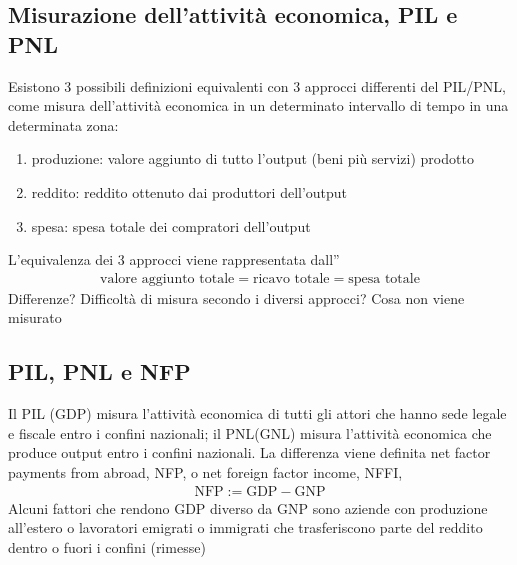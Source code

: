 \documentclass[letterpaper,10pt,italian]{jupyterBook}
\begin{document}
\subsection{Misurazione dell’attività economica, PIL e PNL}
\label{\detokenize{ch/macro:misurazione-dell-attivita-economica-pil-e-pnl}}\label{\detokenize{ch/macro:economics-hs-macro-intro-econ-measure-gdp}}
\sphinxAtStartPar
Esistono 3 possibili definizioni equivalenti con 3 approcci differenti del PIL/PNL, come misura dell’attività economica in un determinato intervallo di tempo in una determinata zona:
\begin{enumerate}
%
\item {} 
\sphinxAtStartPar
produzione: valore aggiunto di tutto l’output (beni più servizi) prodotto

\item {} 
\sphinxAtStartPar
reddito: reddito ottenuto dai produttori dell’output

\item {} 
\sphinxAtStartPar
spesa: spesa totale dei compratori dell’output

\end{enumerate}

\sphinxAtStartPar
L’equivalenza dei 3 approcci viene rappresentata dall”
\begin{equation*}
\begin{split} \text{valore aggiunto totale} = \text{ricavo totale} = \text{spesa totale} \end{split}
\end{equation*}
\sphinxAtStartPar
{} Differenze? Difficoltà di misura secondo i diversi approcci? Cosa non viene misurato


\subsection{PIL, PNL e NFP}
\label{\detokenize{ch/macro:pil-pnl-e-nfp}}\label{\detokenize{ch/macro:economics-hs-macro-intro-econ-measure-gdp-gnp}}
\sphinxAtStartPar
Il PIL (GDP) misura l’attività economica di tutti gli attori che hanno sede legale e fiscale entro i confini nazionali; il PNL(GNL) misura l’attività economica che produce output entro i confini nazionali. La differenza viene definita net factor payments from abroad, NFP, o net foreign factor income, NFFI,
\begin{equation*}
\begin{split}\text{NFP} := \text{GDP} - \text{GNP}\end{split}
\end{equation*}
\sphinxAtStartPar
Alcuni fattori che rendono GDP diverso da GNP sono aziende con produzione all’estero o lavoratori emigrati o immigrati che trasferiscono parte del reddito dentro o fuori i confini (rimesse)
\end{document}
